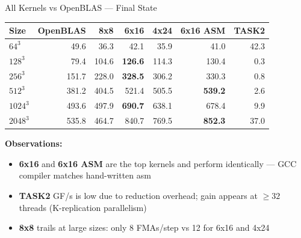 \documentclass[aspectratio=169]{beamer}
\begin{document}
\begin{frame}{All Kernels vs OpenBLAS --- Final State}
  \vspace{-0.1cm}
  \begin{table}
    \centering
    \small
    \begin{tabular}{lrrrrrr}
      \toprule
      \textbf{Size} & \textbf{OpenBLAS} & \textbf{8x8} & \textbf{6x16} & \textbf{4x24} & \textbf{6x16 ASM} & \textbf{TASK2} \\
      \midrule
      $64^3$    & 49.6  & 36.3  & 42.1  & 35.9  & 41.0  & 42.3  \\
      $128^3$   & 79.4  & 104.6 & \textbf{126.6} & 114.3 & 130.4 & 0.3 \\
      $256^3$   & 151.7 & 228.0 & \textbf{328.5} & 306.2 & 330.3 & 0.8 \\
      $512^3$   & 381.2 & 404.5 & 521.4 & 505.5 & \textbf{539.2} & 2.6 \\
      $1024^3$  & 493.6 & 497.9 & \textbf{690.7} & 638.1 & 678.4 & 9.9 \\
      $2048^3$  & 535.8 & 464.7 & 840.7 & 769.5 & \textbf{852.3} & 37.0 \\
      \bottomrule
    \end{tabular}
  \end{table}
  \vspace{0.3cm}
  \small
  \textbf{Observations:}
  \begin{itemize}
    \item \textbf{6x16} and \textbf{6x16 ASM} are the top kernels and perform identically --- GCC compiler matches hand-written asm
    \item \textbf{TASK2} GF/s is low due to reduction overhead; gain appears at $\geq 32$ threads (K-replication parallelism)
    \item \textbf{8x8} trails at large sizes: only 8 FMAs/step vs 12 for 6x16 and 4x24
  \end{itemize}
\end{frame}
\end{document}
